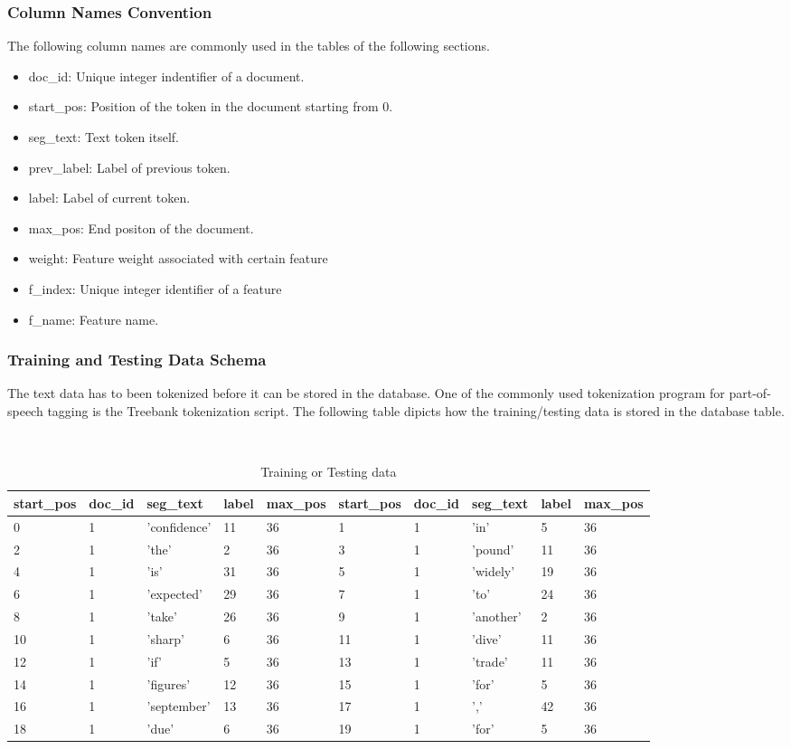 \subsubsection{Column Names Convention}
The following column names are commonly used in the tables of the following sections.
\begin{itemize}
\item doc\_id: Unique integer indentifier of a document.
\item start\_pos: Position of the token in the document starting from 0.
\item seg\_text: Text token itself.
\item prev\_label: Label of previous token.
\item label: Label of current token.
\item max\_pos: End positon of the document.
\item weight: Feature weight associated with certain feature
\item f\_index: Unique integer identifier of a feature
\item f\_name: Feature name.
\end{itemize}

\subsubsection{Training and Testing Data Schema}
The text data has to been tokenized before it can be stored in the database. One of the commonly used tokenization program for part-of-speech
tagging is the Treebank tokenization script.
The following table dipicts how the training/testing data is stored in the database table.

\begin {table}[h]
\caption {Training or Testing data} \label{tab:trainingdata}
\begin{center}
    \footnotesize\tt
\begin{tabular}{lllll||lllll}
  start\_pos & doc\_id & seg\_text & label & max\_pos & start\_pos & doc\_id & seg\_text & label & max\_pos\\
  \hline
        0&1&'confidence'&11&36& 1&1&'in'&5&36\\
        2&1&'the'&2&36& 3&1&'pound'&11&36\\
        4&1&'is'&31&36& 5&1&'widely'&19&36\\
        6&1&'expected'&29&36& 7&1&'to'&24&36\\
        8&1&'take'&26&36& 9&1&'another'&2&36\\
        10&1&'sharp'&6&36& 11&1&'dive'&11&36\\
        12&1&'if'&5&36& 13&1&'trade'&11&36\\
        14&1&'figures'&12&36& 15&1&'for'&5&36\\
        16&1&'september'&13&36& 17&1&','&42&36\\
        18&1&'due'&6&36& 19&1&'for'&5&36\\\hline
\end{tabular}
\end{center}
\end{table}

